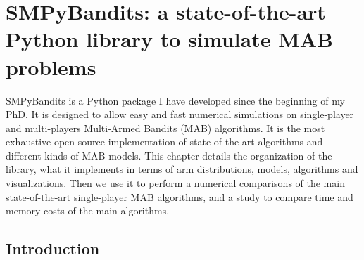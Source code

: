 
\chapter{SMPyBandits: a state-of-the-art Python library to simulate MAB problems}
\label{chapter:3}

\graphicspath{{2-Chapters/3-Chapter/Images/}{2-Chapters/3-Chapter/logs/}{2-Chapters/3-Chapter/SMPyBandits_paper.git/plots/}}


\abstractStartChapter{}%
%
SMPyBandits is a Python package I have developed since the beginning of my PhD.
It is designed to allow easy and fast numerical simulations on single-player and multi-players Multi-Armed Bandits (MAB) algorithms.
It is the most exhaustive open-source implementation of state-of-the-art algorithms and different kinds of MAB models.
%
This chapter details the organization of the library, what it implements in terms of arm distributions, models, algorithms and visualizations.
Then we use it to perform a numerical comparisons of the main state-of-the-art single-player MAB algorithms, and a study to compare time and memory costs of the main algorithms.

\minitocStartChapter{}

\section{Introduction}
\label{sec:3:Introduction}



